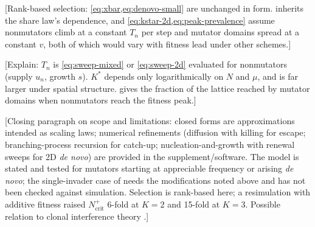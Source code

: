 [Rank-based selection: \cref{eq:xbar,eq:denovo-small} are unchanged in form.  inherits the share law's dependence, and \cref{eq:kstar-2d,eq:peak-prevalence} assume nonmutators climb at a constant $T_n$ per step and mutator domains spread at a constant $v$, both of which would vary with fitness lead under other schemes.]

[Explain: $T_n$ is \cref{eq:sweep-mixed} or \cref{eq:sweep-2d} evaluated for nonmutators (supply $u_n$, growth $s$).
$K^*$ depends only logarithmically on $N$ and $\mu$, and is far larger under spatial structure.
 gives the fraction of the lattice reached by mutator domains when nonmutators reach the fitness peak.]

[Closing paragraph on scope and limitations: closed forms are approximations intended as scaling laws; numerical refinements (diffusion with killing for escape; branching-process recursion for catch-up; nucleation-and-growth with renewal sweeps for 2D \textit{de novo}) are provided in the supplement/software.
The model is stated and tested for mutators starting at appreciable frequency or arising \textit{de novo}; the single-invader case of \citet{raynes2018sign} needs the modifications noted above and has not been checked against simulation.
Selection is rank-based here; a resimulation with additive fitness raised $N_\mathrm{crit}^{+}$ 6-fold at $K = 2$ and 15-fold at $K = 3$.
Possible relation to clonal interference theory \citep{gerrish1998fate,desai2007beneficial,good2016evolution}.]
